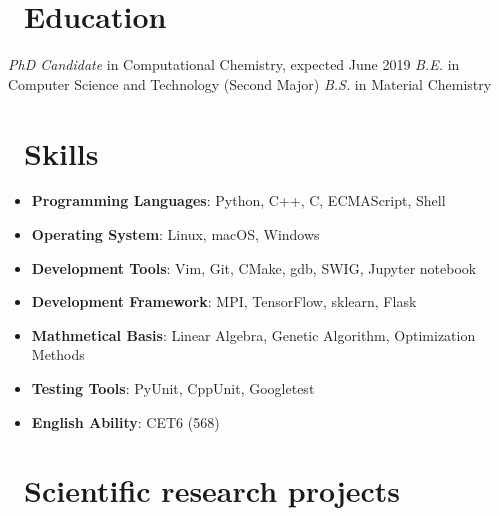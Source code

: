 \documentclass{resume}
\begin{document}


 
\section{\faGraduationCap\  Education}
\textit{PhD Candidate} in Computational Chemistry, expected June 2019
\textit{B.E.} in Computer Science and Technology (Second Major)
\textit{B.S.} in Material Chemistry

\section{\faCogs\ Skills}
\begin{itemize}[parsep=0.5ex]
    \item \textbf{Programming Languages}: Python, C++, C, ECMAScript, Shell
    \item \textbf{Operating System}: Linux, macOS, Windows
    \item \textbf{Development Tools}: Vim, Git, CMake, gdb, SWIG, Jupyter notebook
    \item \textbf{Development Framework}: MPI, TensorFlow, sklearn, Flask
    \item \textbf{Mathmetical Basis}: Linear Algebra, Genetic Algorithm, Optimization Methods
    \item \textbf{Testing Tools}: PyUnit, CppUnit, Googletest
    \item \textbf{English Ability}: CET6 (568)
\end{itemize}

\section{\faUsers\ Scientific research projects}
\end{document}
